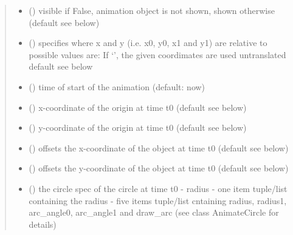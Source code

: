 \documentclass[letterpaper,10pt,english]{sphinxmanual}
\begin{document}
\begin{fulllineitems}
\begin{fulllineitems}
\begin{quote}
\begin{description}
\begin{itemize}
\item {} 
 () \textendash{} visible 
if False, animation object is not shown, shown otherwise
(default see below)

\item {} 
 () \textendash{} specifies where x and y (i.e. x0, y0, x1 and y1) are relative to 
possible values are: 
If ‘’, the given coordimates are used untranslated 
default see below

\item {} 
 () \textendash{} time of start of the animation (default: now)

\item {} 
 () \textendash{} x-coordinate of the origin at time t0 (default see below)

\item {} 
 () \textendash{} y-coordinate of the origin at time t0 (default see below)

\item {} 
 () \textendash{} offsets the x-coordinate of the object at time t0 (default see below)

\item {} 
 () \textendash{} offsets the y-coordinate of the object at time t0 (default see below)

\item {} 
 () \textendash{} the circle spec of the circle at time t0 
- radius 
- one item tuple/list containing the radius 
- five items tuple/list cntaining radius, radius1, arc\_angle0, arc\_angle1 and draw\_arc
(see class AnimateCircle for details)


\end{itemize}
\end{description}
\end{quote}
\end{fulllineitems}
\end{fulllineitems}
\end{document}
